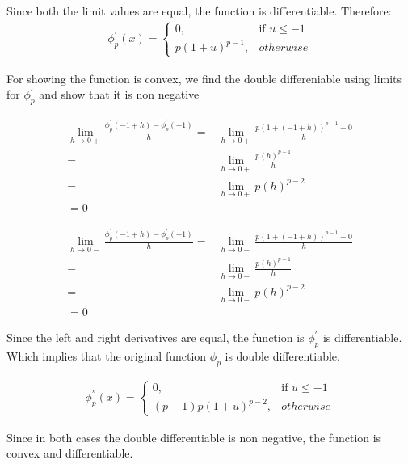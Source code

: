 \documentclass{article}
\begin{document}
\begin{description}
    Since both the limit values are equal, the function is differentiable. Therefore:
    \begin{align*}
        \phi^{'}_{p}\left(x\right) = 
        \begin{cases}
          0, & \textrm{if } u \le -1 \\
          p{(1+u)}^{p-1}, & otherwise
        \end{cases}
    \end{align*}

    For showing the function is convex, we find the double differeniable using limits for \( \phi^{'}_{p} \) and show that it is non negative

    \begin{align*}
      \lim_{h \to 0+} \frac{\phi^{'}_{p}(-1+h) - \phi^{'}_{p}(-1) }{h} = & \lim_{h \to 0+} \frac{p{(1 + (-1 + h))}^{p-1} - 0}{h} \\
      = & \lim_{h \to 0+} \frac{p{(h)}^{p-1}}{h} \\
      = & \lim_{h \to 0+} p{(h)}^{p-2} \\
      = 0
    \end{align*}

    \begin{align*}
      \lim_{h \to 0-} \frac{\phi^{'}_{p}(-1+h) - \phi^{'}_{p}(-1) }{h} = & \lim_{h \to 0-} \frac{p{(1 + (-1 + h))}^{p-1} - 0}{h} \\
      = & \lim_{h \to 0-} \frac{p{(h)}^{p-1}}{h} \\
      = & \lim_{h \to 0-} p{(h)}^{p-2} \\
      = 0
    \end{align*}

    Since the left and right derivatives are equal, the function is \( \phi^{'}_{p} \) is differentiable.  Which implies that the original function \( \phi_{p}\) is double differentiable.

    \begin{align*}
        \phi^{''}_{p}\left(x\right) = 
        \begin{cases}
          0, & \textrm{if } u \le -1 \\
          (p-1)p{(1+u)}^{p-2}, & otherwise
        \end{cases}
    \end{align*}
    
    Since in both cases the double differentiable is non negative, the function is convex and differentiable.

\end{description}
\end{document}
